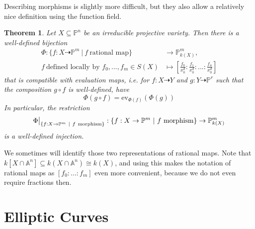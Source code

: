 \documentclass{scrartcl}
\newcommand\restr[2]{{
    \left.\kern-\nulldelimiterspace
    #1
    \vphantom{\big|}
    \right|_{#2}
}}
\newtheorem{theorem}[prop]{Theorem}
\theoremstyle{definition}
\begin{document}
Describing morphisms is slightly more difficult, but they also allow a relatively nice definition using the function field.
\begin{theorem}
    Let $X \subseteq \mathbb{P}^n$ be an irreducible projective variety. Then there is a well-defined bijection
    \begin{align*}
        \Phi: \{ f: X \dashrightarrow \mathbb{P}^m \ | \ f \ \text{rational map} \} &\to \mathbb{P}_{k(X)}^m, \\
        f \ \text{defined locally by $f_0, ..., f_m \in S(X)$} &\mapsto \left[ \frac {f_0} {x_0^d}  : \frac {f_1} {x_0^d} : ... : \frac {f_n} {x_0^d} \right]
    \end{align*}
    that is compatible with evaluation maps, i.e. for $f: X \dashrightarrow Y$ and $g: Y \dashrightarrow \mathbb{P}^r$ such that the composition $g \circ f$ is well-defined, have
    \begin{equation*}
        \Phi(g \circ f) = \mathrm{ev}_{\Phi(f)}(\Phi(g))
    \end{equation*}
    In particular, the restriction
    \begin{equation*}
        \restr{\Phi}{\{f: X \to \mathbb{P}^m \ | \ f \ \text{morphism}\}}: \{f: X \to \mathbb{P}^m \ | \ f \ \text{morphism}\} \to \mathbb{P}_{k(X)}^m
    \end{equation*}
    is a well-defined injection.
\end{theorem}
We sometimes will identify those two representations of rational maps.
Note that $k[X \cap \mathbb{A}^n] \subseteq k(X \cap \mathbb{A}^n) \cong k(X)$, and using this makes the notation of rational maps as $[f_0 : ... : f_m]$ even more convenient, because we do not even require fractions then.

\section{Elliptic Curves}
\end{document}
